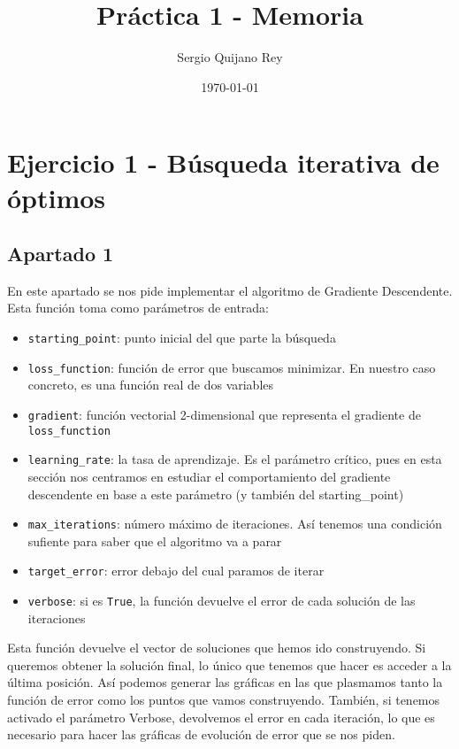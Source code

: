 \documentclass[11pt]{article}
\title{Práctica 1 - Memoria}
\author{Sergio Quijano Rey}
\date{\today}
\begin{document}
\maketitle
\pagebreak

\tableofcontents
\pagebreak

\section{Ejercicio 1 - Búsqueda iterativa de óptimos}

\subsection{Apartado 1}

En este apartado se nos pide implementar el algoritmo de Gradiente Descendente. Esta función toma como parámetros de entrada:

\begin{itemize}
    \item \lstinline{starting_point}: punto inicial del que parte la búsqueda
    \item \lstinline{loss_function}: función de error que buscamos minimizar. En nuestro caso concreto, es una función real de dos variables
    \item \lstinline{gradient}: función vectorial 2-dimensional que representa el gradiente de \lstinline{loss_function}
    \item \lstinline{learning_rate}: la tasa de aprendizaje. Es el parámetro crítico, pues en esta sección nos centramos en estudiar el comportamiento del gradiente descendente en base a este parámetro (y también del starting\_point)
    \item \lstinline{max_iterations}: número máximo de iteraciones. Así tenemos una condición sufiente para saber que el algoritmo va a parar
    \item \lstinline{target_error}: error debajo del cual paramos de iterar
    \item \lstinline{verbose}: si es \lstinline{True}, la función devuelve el error de cada solución de las iteraciones
\end{itemize}

Esta función devuelve el vector de soluciones que hemos ido construyendo. Si queremos obtener la solución final, lo único que tenemos que hacer es acceder a la última posición. Así podemos generar las gráficas en las que plasmamos tanto la función de error como los puntos que vamos construyendo. También, si tenemos activado el parámetro Verbose, devolvemos el error en cada iteración, lo que es necesario para hacer las gráficas de evolución de error que se nos piden.
\end{document}
